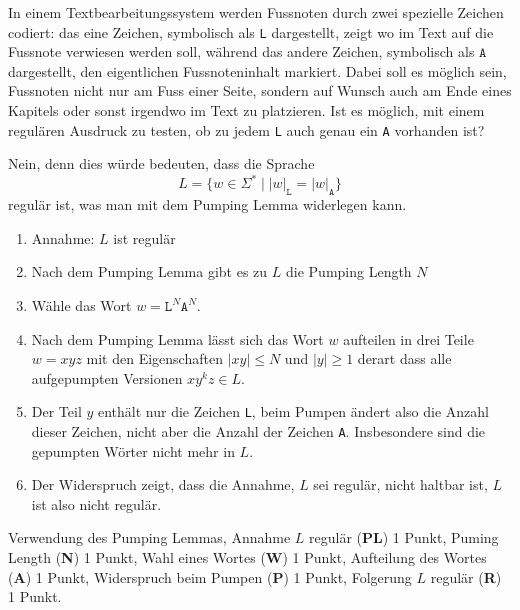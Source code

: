 In einem Textbearbeitungssystem werden Fussnoten durch zwei spezielle
Zeichen codiert: das eine Zeichen, symbolisch als \texttt{L} dargestellt,
zeigt wo im Text auf die Fussnote verwiesen werden soll, während das
andere Zeichen, symbolisch als $\texttt{A}$ dargestellt, den eigentlichen
Fussnoteninhalt markiert.
Dabei soll es möglich sein, Fussnoten nicht nur am Fuss einer Seite, sondern
auf Wunsch auch am Ende eines Kapitels oder sonst irgendwo im Text zu
platzieren.
Ist es möglich, mit einem regulären Ausdruck zu testen, ob zu jedem 
\texttt{L} auch genau ein \texttt{A} vorhanden ist?


\begin{loesung}
Nein, denn dies würde bedeuten, dass die Sprache
\[
L = \{w\in\Sigma^*\mid |w|_{\texttt{L}} = |w|_{\texttt{A}}\}
\]
regulär ist, was man mit dem Pumping Lemma widerlegen kann.
\begin{enumerate}
\item Annahme: $L$ ist regulär
\item Nach dem Pumping Lemma gibt es zu $L$ die Pumping Length $N$
\item Wähle das Wort $w=\texttt{L}^N\texttt{A}^N$.
\item Nach dem Pumping Lemma lässt sich das Wort $w$ aufteilen in drei Teile
$w=xyz$ mit den Eigenschaften $|xy|\le N$ und $|y|\ge 1$ derart dass
alle aufgepumpten Versionen $xy^kz\in L$.
\item Der Teil $y$ enthält nur die Zeichen \texttt{L}, beim Pumpen
ändert also die Anzahl dieser Zeichen, nicht aber die Anzahl der Zeichen
\texttt{A}.
Insbesondere sind die gepumpten Wörter nicht mehr in $L$.
\item Der Widerspruch zeigt, dass die Annahme, $L$ sei regulär, nicht
haltbar ist, $L$ ist also nicht regulär.
\qedhere
\end{enumerate}
\end{loesung}

\begin{bewertung}
Verwendung des Pumping Lemmas, Annahme $L$ regulär ({\bf PL}) 1 Punkt,
Puming Length ({\bf N}) 1 Punkt,
Wahl eines Wortes ({\bf W}) 1 Punkt,
Aufteilung des Wortes ({\bf A}) 1 Punkt,
Widerspruch beim Pumpen ({\bf P}) 1 Punkt,
Folgerung $L$ regulär ({\bf R}) 1 Punkt.
\end{bewertung}
